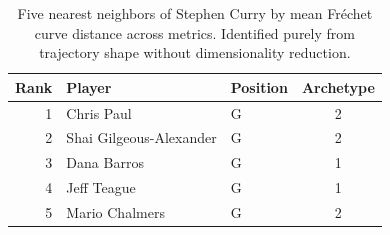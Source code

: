 \begin{table}[htbp]
  \centering\small
  \begin{tabular}{rllc}
    \toprule
    Rank & Player & Position & Archetype \\
    \midrule
    1 & Chris Paul & G & 2 \\
    2 & Shai Gilgeous-Alexander & G & 2 \\
    3 & Dana Barros & G & 1 \\
    4 & Jeff Teague & G & 1 \\
    5 & Mario Chalmers & G & 2 \\
    \bottomrule
  \end{tabular}
  \caption{Five nearest neighbors of Stephen Curry by mean Fr\'{e}chet curve distance across metrics. Identified purely from trajectory shape without dimensionality reduction.}
  \label{tab:Stephen_Curry_frechet_curve_neighbors}
\end{table}

